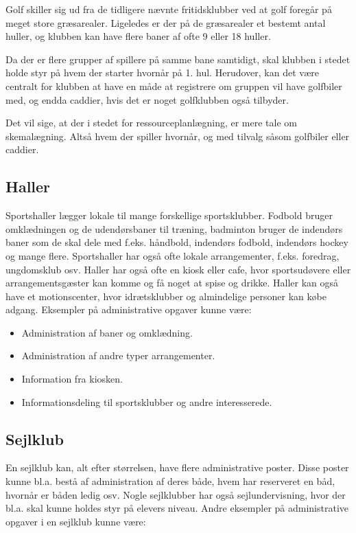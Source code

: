 Golf skiller sig ud fra de tidligere nævnte fritidsklubber ved at golf foregår på meget store græsarealer. Ligeledes er der på de græsarealer et bestemt antal huller, og klubben kan have flere baner af ofte 9 eller 18 huller. 

Da der er flere grupper af spillere på samme bane samtidigt, skal klubben i stedet holde styr på hvem der starter hvornår på 1. hul. Herudover, kan det være centralt for klubben at have en måde at registrere om gruppen vil have golfbiler med, og endda caddier, hvis det er noget golfklubben også tilbyder.

Det vil sige, at der i stedet for ressourceplanlægning, er mere tale om skemalægning. Altså hvem der spiller hvornår, og med tilvalg såsom golfbiler eller caddier.


\subsection{Haller}

Sportshaller lægger lokale til mange forskellige sportsklubber. Fodbold bruger omklædningen og de udendørsbaner til træning, badminton bruger de indendørs baner som de skal dele med f.eks. håndbold, indendørs fodbold, indendørs hockey og mange flere. Sportshaller har også ofte lokale arrangementer, f.eks. foredrag, ungdomsklub osv. 
Haller har også ofte en kiosk eller cafe, hvor sportsudøvere eller arrangementsgæster kan komme og få noget at spise og drikke. 
Haller kan også have et motionscenter, hvor idrætsklubber og almindelige personer kan købe adgang\citep{spt hal}.
Eksempler på administrative opgaver kunne være:

\begin{itemize}
\item Administration af baner og omklædning.
\item Administration af andre typer arrangementer.
\item Information fra kiosken.
\item Informationsdeling til sportsklubber og andre interesserede.
\end{itemize}

\subsection{Sejlklub}
En sejlklub kan, alt efter størrelsen, have flere administrative poster. Disse poster kunne bl.a. bestå af administration af deres både, hvem har reserveret en båd, hvornår er båden ledig osv. Nogle sejlklubber har også sejlundervisning, hvor der bl.a. skal kunne holdes styr på elevers niveau. Andre eksempler på administrative opgaver i en sejlklub kunne være: 

